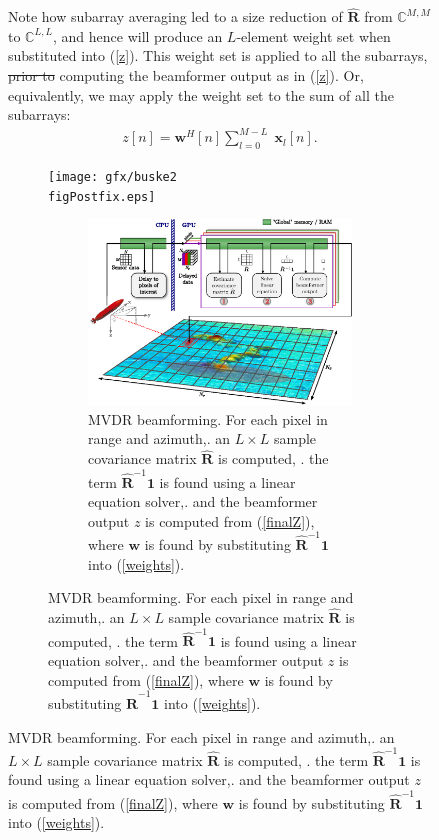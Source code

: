 \documentclass[12pt,journal,draftclsnofoot,onecolumn]{IEEEtran}
\let\MYoriglatexcaption\caption               %
\renewcommand{\caption}[2][\relax]{\MYoriglatexcaption[#2]{#2}}
\newcommand\sumb[2]{\sum\limits_{#1}^{#2}\;}
\renewcommand\H{^{\scriptscriptstyle H}}
\renewcommand\vec[1]{\boldsymbol{#1}}
\newcommand\mat[1]{\boldsymbol{#1}}
\newcommand\1{\vec 1}
\newcommand*\w{\vec w}
\newcommand*\x{\vec x}
\newcommand*\eR{\mat{\hat R}}
\providecommand{\DIFaddtex}[1]{{\protect\color{blue}\uwave{#1}}} %
\providecommand{\DIFdeltex}[1]{{\protect\color{red}\sout{#1}}}                      %
\providecommand{\DIFaddbegin}{} %
\providecommand{\DIFaddend}{} %
\providecommand{\DIFdelbegin}{} %
\providecommand{\DIFdelend}{} %
\providecommand{\DIFaddbeginFL}{} %
\providecommand{\DIFaddendFL}{} %
\providecommand{\DIFdelbeginFL}{} %
\providecommand{\DIFdelendFL}{} %
\providecommand{\DIFadd}[1]{\texorpdfstring{\DIFaddtex{#1}}{#1}} %
\providecommand{\DIFdel}[1]{\texorpdfstring{\DIFdeltex{#1}}{}} %
\begin{document}
\begin{figure}
Note how subarray averaging led to a size reduction of $\eR$ from $\mathbb{C}^{M,M}$ to $\mathbb{C}^{L,L}$, and hence will produce an $L$-element weight set when substituted into (\ref{z}). This weight set is applied to all the subarrays, \DIFdelbegin \DIFdel{prior to }\DIFdelend \DIFaddbegin \DIFadd{before }\DIFaddend computing the beamformer output as in (\ref{z}). Or, equivalently, we may apply the weight set to the sum of all the subarrays:
\begin{align}
z[n] = \w\H[n] \sumb{l=0}{M-L} \x_l[n].\label{finalZ}
\end{align}
\ifPeerReview
\begin{figure}
[!t]\centering
\DIFdelbeginFL %
\DIFdelendFL \DIFaddbeginFL \texttt{[image: gfx/buske2\\figPostfix.eps]}
\DIFaddendFL \else
\begin{figure}
[!t]\centering
\includegraphics[width=\linewidth]{gfx/implementation.eps}
\fi%
\caption{MVDR beamforming. For each pixel in range and azimuth,\newline
1. an $L\times{}L$ sample covariance matrix $\eR$ is computed, \newline
2. the term $\eR^{-1}\1$ is found using a linear equation solver,\newline
3. and the beamformer output $z$ is computed from (\ref{finalZ}), where $\w$ is found by substituting $\eR^{-1}\1$ into (\ref{weights}). } \label{mvdr_beamforming}
\end{figure}

\end{figure}
\end{figure}
\end{document}
